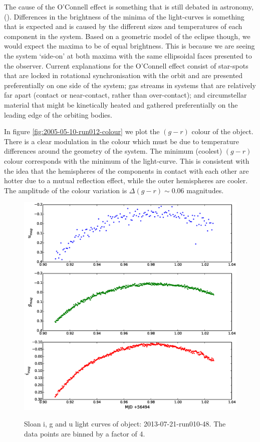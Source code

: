 The cause of the O'Connell effect is something that is still debated in astronomy, (\cite{oconnelleffect}). Differences in the brightness of the minima of the light-curves is something that is expected and is caused by the different sizes and temperatures of each component in the system. Based on a geometric model of the eclipse though, we would expect the maxima to be of equal brightness. This is because we are seeing the system `side-on' at both maxima with the same ellipsoidal faces presented to the observer. Current explanations for the O'Connell effect consist of star-spots that are locked in rotational synchronisation with the orbit and are presented preferentially on one side of the system; gas streams in systems that are relatively far apart (contact or near-contact, rather than over-contact); and circumstellar material that might be kinetically heated and gathered preferentially on the leading edge of the orbiting bodies.  

In figure \ref{fig:2005-05-10-run012-colour} we plot the $(g-r)$ colour of the object. There is a clear modulation in the colour which must be due to temperature differences around the geometry of the system. The minimum (coolest) $(g - r)$ colour corresponds with the minimum of the light-curve. This is consistent with the idea that the hemispheres of the components in contact with each other are hotter due to a mutual reflection effect, while the outer hemispheres are cooler. The amplitude of the colour variation is $\Delta{(g-r)} \sim 0.06$ magnitudes.


\newpage

\begin{figure}
  \includegraphics[width=120mm]{images/2013-07-21-run010-48_lightcurve-bin4.eps} 
  \label{fig:2013-07-21-run010-48}
  \caption{Sloan i, g and u light curves of object: 2013-07-21-run010-48. The data points are binned by a factor of 4.}
\end{figure}


